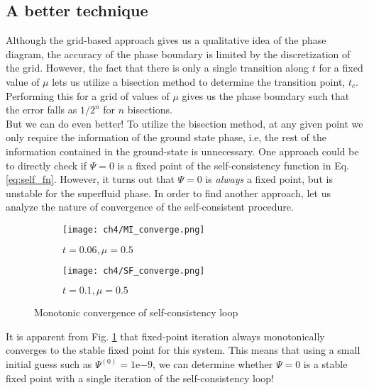 \subsection{A better technique}
Although the grid-based approach gives us a qualitative idea of the phase diagram, the accuracy of the phase boundary is limited by the discretization of the grid. However, the fact that there is only a single transition along $t$ for a fixed value of $\mu$ lets us utilize a bisection method to determine the transition point, $t_c$. Performing this for a grid of values of $\mu$ gives us the phase boundary such that the error falls as $1/2^n$ for $n$ bisections.
\vspace{0.5cm}\\
But we can do even better! To utilize the bisection method, at any given point we only require the information of the ground state phase, i.e, the rest of the information contained in the ground-state is unnecessary. One approach could be to directly check if $\Psi = 0$ is a fixed point of the self-consistency function in Eq. \ref{eq:self_fn}. However, it turns out that $\Psi=0$ is \textit{always} a fixed point, but is unstable for the superfluid phase. In order to find another approach, let us analyze the nature of convergence of the self-consistent procedure.
\begin{figure}[!htb]
    \centering
    \begin{subfigure}[b]{0.45\textwidth}  %
        \centering
        \texttt{[image: ch4/MI\_converge.png]}
        \caption{$t = 0.06, \mu = 0.5$}
    \end{subfigure}
    \hspace{1em}  %
    \begin{subfigure}[b]{0.45\textwidth}
        \centering
        \texttt{[image: ch4/SF\_converge.png]}
        \caption{$t = 0.1, \mu = 0.5$}
    \end{subfigure}
    \caption{Monotonic convergence of self-consistency loop}
    \label{fig:self_consistent_converge}
\end{figure}
\FloatBarrier \!\!\!\!\!\!\!\!\!\!\!

It is apparent from Fig. \ref{fig:self_consistent_converge} that fixed-point iteration always monotonically converges to the stable fixed point for this system. This means that using a small initial guess such as $\Psi^{(0)} = 1\mathrm{e}{-9}$, we can determine whether $\Psi=0$ is a stable fixed point with a single iteration of the self-consistency loop\cite{Luhmann2013, Kho16}! 


